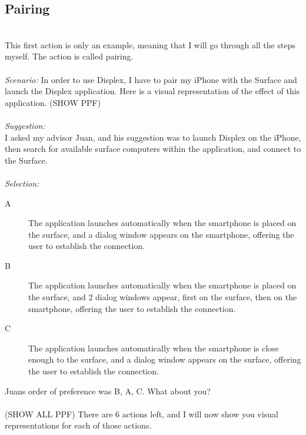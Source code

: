 \documentclass[11pt]{amsart}
\begin{document}
\subsection{Pairing}
\hfill\\
This first action is only an example, meaning that I will go through all the steps myself.
The action is called pairing.
\\\\
\emph{Scenario:}
In order to use Displex, I have to pair my iPhone with the Surface and launch the Displex application.
Here is a visual representation of the effect of this application.
(SHOW PPF)
\\\\
\emph{Suggestion:}\\
I asked my advisor Juan, and his suggestion was to launch Displex on the iPhone, then search for available surface computers within the application,  and connect to the Surface.
\\\\
\emph{Selection:}
\begin{description}
\item[A]{The application launches automatically when the smartphone is placed on the surface, and a dialog window appears on the smartphone, offering the user to establish the connection.}
\item[B]{The application launches automatically when the smartphone is placed on the surface, and 2 dialog windows appear, first on the surface, then on the smartphone, offering the user to establish the connection.}
\item[C]{The application launches automatically when the smartphone is close enough to the surface, and a dialog window appears on the surface, offering the user to establish the connection.}
\end{description}

Juans order of preference was B, A, C.
What about you?
\\\\
(SHOW ALL PPF)
There are 6 actions left, and I will now show you visual representations for each of those actions.
\end{document}
